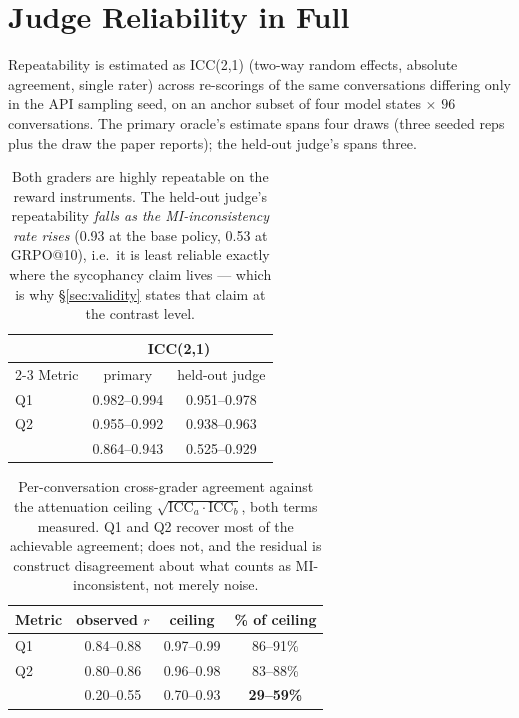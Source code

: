\section{Judge Reliability in Full}
\label{app:reliability}

Repeatability is estimated as ICC(2,1) (two-way random effects, absolute agreement, single
rater) across re-scorings of the same conversations differing only in the API sampling seed,
on an anchor subset of four model states $\times$ $96$ conversations. The primary oracle's
estimate spans four draws (three seeded reps plus the draw the paper reports); the held-out
judge's spans three.

\begin{table}[h]
  \centering\small
  \begin{tabular}{@{}lcc@{}}
    \toprule
    & \multicolumn{2}{c}{ICC(2,1)}\\
    \cmidrule(lr){2-3}
    Metric & primary & held-out judge\\
    \midrule
    Q1     & 0.982--0.994 & 0.951--0.978\\
    Q2     & 0.955--0.992 & 0.938--0.963\\
    \mici{} & 0.864--0.943 & 0.525--0.929\\
    \bottomrule
  \end{tabular}
  \caption{Both graders are highly repeatable on the reward instruments. The held-out
  judge's \mici{} repeatability \emph{falls as the MI-inconsistency rate rises} (0.93 at the
  base policy, 0.53 at GRPO@10), i.e.\ it is least reliable exactly where the sycophancy
  claim lives --- which is why \S\ref{sec:validity} states that claim at the contrast level.}
  \label{tab:icc}
\end{table}

\begin{table}[h]
  \centering\small
  \begin{tabular}{@{}lccc@{}}
    \toprule
    Metric & observed $r$ & ceiling & \% of ceiling\\
    \midrule
    Q1      & 0.84--0.88 & 0.97--0.99 & 86--91\%\\
    Q2      & 0.80--0.86 & 0.96--0.98 & 83--88\%\\
    \mici{} & 0.20--0.55 & 0.70--0.93 & \textbf{29--59\%}\\
    \bottomrule
  \end{tabular}
  \caption{Per-conversation cross-grader agreement against the attenuation ceiling
  $\sqrt{\mathrm{ICC}_a\cdot\mathrm{ICC}_b}$, both terms measured. Q1 and Q2 recover most of
  the achievable agreement; \mici{} does not, and the residual is construct disagreement
  about what counts as MI-inconsistent, not merely noise.}
  \label{tab:ceiling}
\end{table}

